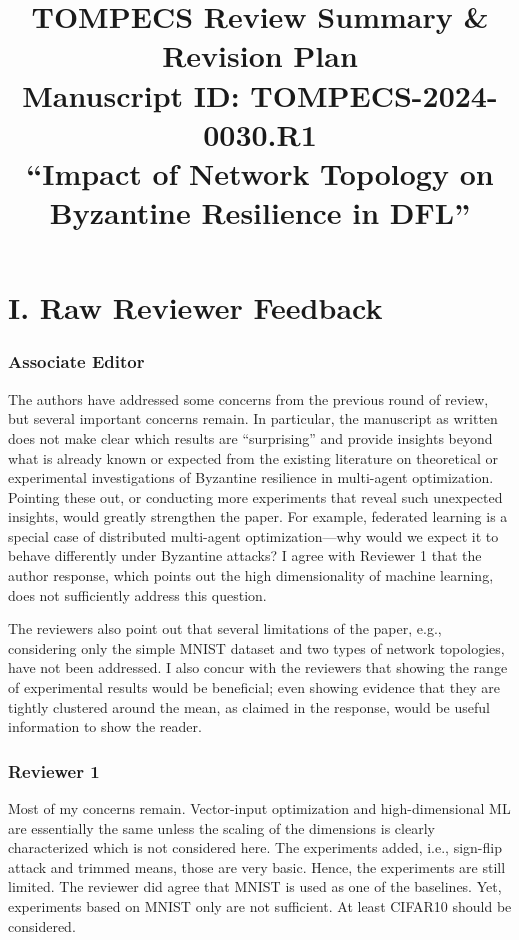 \documentclass[11pt]{article}
\title{\textbf{TOMPECS Review Summary \& Revision Plan}\\[4pt]
\normalsize Manuscript ID: TOMPECS-2024-0030.R1\\
``Impact of Network Topology on Byzantine Resilience in DFL''}
\author{}
\date{}
\begin{document}
\maketitle
\vspace{-2em}

\part*{I. Raw Reviewer Feedback}

\section{Associate Editor}

\begin{reviewquote}
The authors have addressed some concerns from the previous round of review, but several important concerns remain. In particular, the manuscript as written does not make clear which results are ``surprising'' and provide insights beyond what is already known or expected from the existing literature on theoretical or experimental investigations of Byzantine resilience in multi-agent optimization. Pointing these out, or conducting more experiments that reveal such unexpected insights, would greatly strengthen the paper. For example, federated learning is a special case of distributed multi-agent optimization---why would we expect it to behave differently under Byzantine attacks? I agree with Reviewer 1 that the author response, which points out the high dimensionality of machine learning, does not sufficiently address this question.

\medskip

The reviewers also point out that several limitations of the paper, e.g., considering only the simple MNIST dataset and two types of network topologies, have not been addressed. I also concur with the reviewers that showing the range of experimental results would be beneficial; even showing evidence that they are tightly clustered around the mean, as claimed in the response, would be useful information to show the reader.
\end{reviewquote}

\section{Reviewer 1}

\begin{reviewquote}
Most of my concerns remain. Vector-input optimization and high-dimensional ML are essentially the same unless the scaling of the dimensions is clearly characterized which is not considered here. The experiments added, i.e., sign-flip attack and trimmed means, those are very basic. Hence, the experiments are still limited. The reviewer did agree that MNIST is used as one of the baselines. Yet, experiments based on MNIST only are not sufficient. At least CIFAR10 should be considered.
\end{reviewquote}
\end{document}

